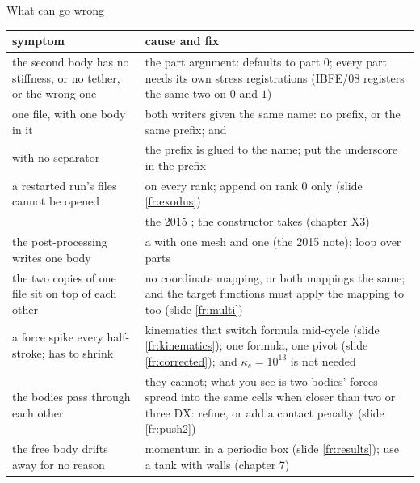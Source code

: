 \documentclass[aspectratio=169,11pt]{beamer}
\begin{document}
\begin{frame}{What can go wrong}
\label{fr:wrong}
\scriptsize
\begin{tabular}{@{}L{0.40\textwidth}L{0.52\textwidth}@{}}
\toprule
symptom & cause and fix \\
\midrule
the second body has no stiffness, or no tether, or the wrong one & the part argument:  defaults to part $0$; every part needs its own stress registrations (IBFE/08 registers the same two on $0$ and $1$) \\
one  file, with one body in it & both writers given the same name: no prefix, or the same prefix;  and  \\
 with no separator & the prefix is glued to the name; put the underscore in the prefix \\
a restarted run's  files cannot be opened &  on every rank; append on rank $0$ only (slide \ref{fr:exodus}) \\
 & the 2015 ; the constructor takes  (chapter X3) \\
the post-processing writes one body & a  with one mesh and one  (the 2015 note); loop over parts \\
the two copies of one file sit on top of each other & no coordinate mapping, or both mappings the same; and the target functions must apply the mapping to  too (slide \ref{fr:multi}) \\
a force spike every half-stroke;  has to shrink & kinematics that switch formula mid-cycle (slide \ref{fr:kinematics}); one formula, one pivot (slide \ref{fr:corrected}); and $\kappa_s = 10^{13}$ is not needed \\
the bodies pass through each other & they cannot; what you see is two bodies' forces spread into the same cells when closer than two or three $\mathrm{DX}$: refine, or add a contact penalty (slide \ref{fr:push2}) \\
the free body drifts away for no reason & momentum in a periodic box (slide \ref{fr:results}); use a tank with walls (chapter 7) \\
\bottomrule
\end{tabular}

\end{frame}
\end{document}
